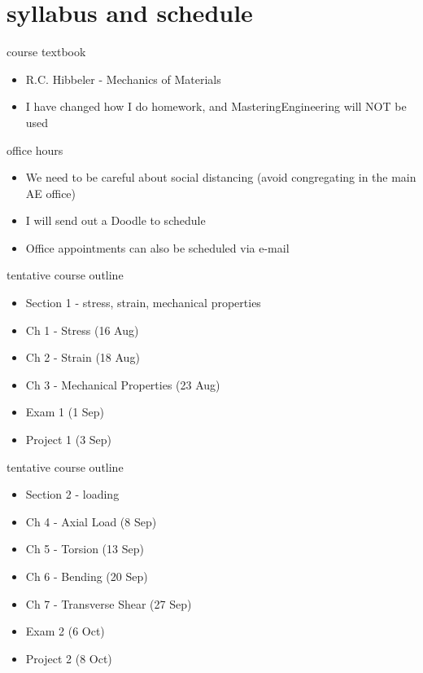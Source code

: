 \documentclass[12pt,handout]{beamer}
\providecommand{\tightlist}{%
  \setlength{\itemsep}{0pt}\setlength{\parskip}{0pt}}
\providecommand{\tightlist}{%
\setlength{\itemsep}{0pt}\setlength{\parskip}{0pt}}
\begin{document}
\hypertarget{syllabus-and-schedule}{%
\section{syllabus and schedule}\label{syllabus-and-schedule}}

\begin{frame}{course textbook}
\protect\hypertarget{course-textbook}{}
\begin{itemize}
\tightlist
\item
  R.C. Hibbeler - Mechanics of Materials
\item
  I have changed how I do homework, and MasteringEngineering will NOT be
  used
\end{itemize}
\end{frame}

\begin{frame}{office hours}
\protect\hypertarget{office-hours}{}
\begin{itemize}
\tightlist
\item
  We need to be careful about social distancing (avoid congregating in
  the main AE office)
\item
  I will send out a Doodle to schedule
\item
  Office appointments can also be scheduled via e-mail
\end{itemize}
\end{frame}

\begin{frame}{tentative course outline}
\protect\hypertarget{tentative-course-outline}{}
\begin{itemize}
\tightlist
\item
  Section 1 - stress, strain, mechanical properties
\item
  Ch 1 - Stress (16 Aug)
\item
  Ch 2 - Strain (18 Aug)
\item
  Ch 3 - Mechanical Properties (23 Aug)
\item
  Exam 1 (1 Sep)
\item
  Project 1 (3 Sep)
\end{itemize}
\end{frame}

\begin{frame}{tentative course outline}
\protect\hypertarget{tentative-course-outline-1}{}
\begin{itemize}
\tightlist
\item
  Section 2 - loading
\item
  Ch 4 - Axial Load (8 Sep)
\item
  Ch 5 - Torsion (13 Sep)
\item
  Ch 6 - Bending (20 Sep)
\item
  Ch 7 - Transverse Shear (27 Sep)
\item
  Exam 2 (6 Oct)
\item
  Project 2 (8 Oct)
\end{itemize}
\end{frame}
\end{document}
